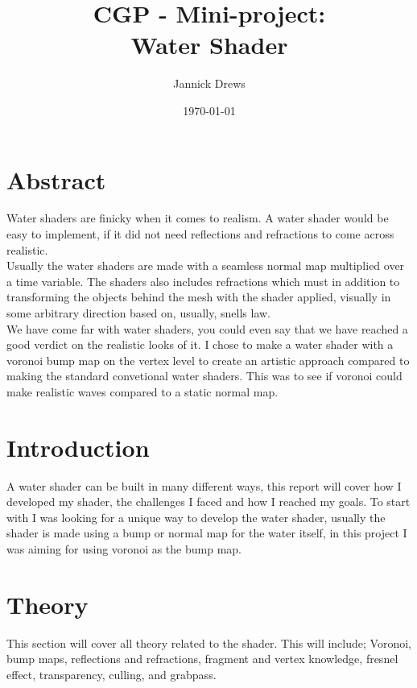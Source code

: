 \documentclass{article}
\title{CGP - Mini-project:\\Water Shader}
\author{Jannick Drews}
\date{\today}
\begin{document}
\maketitle
\newpage
{}


\section{Abstract}
\label{sec:abstract}
Water shaders are finicky when it comes to realism. A water shader would be easy to implement, if it did not need reflections and refractions to come across realistic.\\
Usually the water shaders are made with a seamless normal map multiplied over a time variable. The shaders also includes refractions which must in addition to transforming the objects behind the mesh with the shader applied, visually in some arbitrary direction based on, usually, snells law.\\
We have come far with water shaders, you could even say that we have reached a good verdict on the realistic looks of it.
I chose to make a water shader with a voronoi bump map on the vertex level to create an artistic approach compared to making the standard convetional water shaders. This was to see if voronoi could make realistic waves compared to a static normal map.

\section{Introduction}
\label{sec:introduction}
A water shader can be built in many different ways, this report will cover how I developed my shader, the challenges I faced and how I reached my goals. To start with I was looking for a unique way to develop the water shader, usually the shader is made using a bump or normal map for the water itself, in this project I was aiming for using voronoi as the bump map.

\section{Theory}
\label{sec:theory}
This section will cover all theory related to the shader. This will include; Voronoi, bump maps, reflections and refractions, fragment and vertex knowledge, fresnel effect, transparency, culling, and grabpass.
\end{document}
